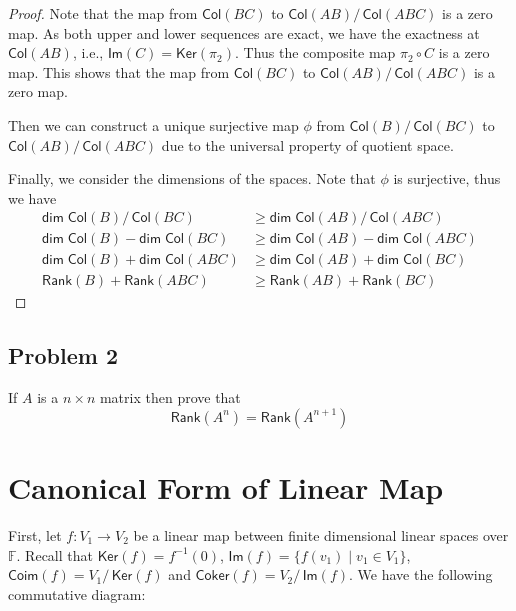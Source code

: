 \documentclass[
	11pt, %
	fleqn, %
	a4paper, %
]{LegrandOrangeBook}
\renewcommand{\ker}[1]{\mathsf{Ker}(#1)} %
\renewcommand{\Im}[1]{\mathsf{Im}(#1)} %
\newcommand{\quotient}[2]{#1/\, #2} %
\newcommand{\F}{\mathbb{F}} %
\newcommand{\rank}[1]{\mathsf{Rank}(#1)} %
\newcommand{\coker}[1]{\mathsf{Coker}(#1)} %
\newcommand{\coim}[1]{\mathsf{Coim}(#1)} %
\newcommand{\col}[1]{\mathsf{Col}(#1)} %
\renewcommand{\dim}{\mathsf{dim\;}} %
\begin{document}
\begin{proof}
    Note that the map from $\col{BC}$ to $\quotient{\col{AB}}{\col{ABC}}$ is a zero map. As both upper and lower sequences are exact, we have the exactness at $\col{AB}$, i.e., $\Im{C} = \ker{\pi_2}$. Thus the composite map $\pi_2 \circ C$ is a zero map. This shows that the map from $\col{BC}$ to $\quotient{\col{AB}}{\col{ABC}}$ is a zero map.

    Then we can construct a unique surjective map $\phi$ from $\quotient{\col{B}}{\col{BC}}$ to $\quotient{\col{AB}}{\col{ABC}}$ due to the universal property of quotient space.

    Finally, we consider the dimensions of the spaces. Note that $\phi$ is surjective, thus we have
    \[
        \begin{split}
            \dim{\quotient{\col{B}}{\col{BC}}} & \geq \dim{\quotient{\col{AB}}{\col{ABC}}} \\
            \dim{\col{B}} - \dim{\col{BC}} & \geq \dim{\col{AB}} - \dim{\col{ABC}} \\
            \dim{\col{B}} + \dim{\col{ABC}} & \geq \dim{\col{AB}} + \dim{\col{BC}} \\
            \rank{B} + \rank{ABC} & \geq \rank{AB} + \rank{BC}
        \end{split}
    \]
\end{proof}

\subsection{Problem 2}

\begin{problem}
    If $A$ is a $n \times n$ matrix then prove that
    \[
        \rank{A^n} = \rank{A^{n+1}}
    \]
\end{problem}


\newpage

\section{Canonical Form of Linear Map}

First, let $f : V_1 \to V_2$ be a linear map between finite dimensional linear spaces over $\F$. Recall that $\ker{f} = f^{-1} (0)$, $\Im{f} = \{f(v_1) \mid v_1 \in V_1\}$, $\coim{f} = \quotient{V_1}{\ker{f}}$ and $\coker{f} = \quotient{V_2}{\Im{f}}$. We have the following commutative diagram:

\begin{center}
\end{center}
\end{document}
